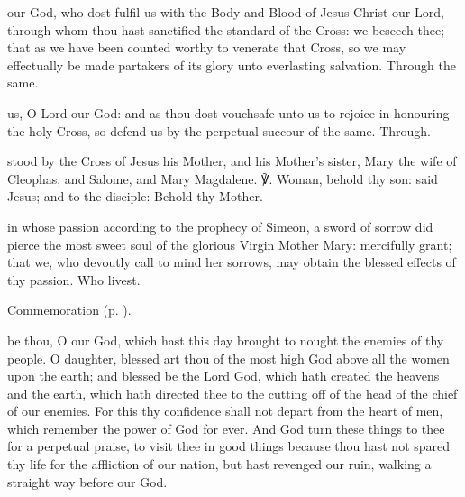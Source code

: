 
\secret
{} our God, who dost fulfil us with the Body and Blood of Jesus Christ our Lord, through whom thou hast sanctified the standard of the Cross: we beseech thee; that as we have been counted worthy to venerate that Cross, so we may effectually be made partakers of its glory unto everlasting salvation. Through the same.


\postcommunion
{} us, O Lord our God: and as thou dost vouchsafe unto us to rejoice in honouring the holy Cross, so defend us by the perpetual succour of the same. Through.


\clearpage
{}

\introit
{} stood by the Cross of Jesus his Mother, and his Mother's sister, Mary the wife of Cleophas, and Salome, and Mary Magdalene. ℣. Woman, behold thy son: said Jesus; and to the disciple: Behold thy Mother.

\collect\label{SevenSorrowsCollect}
 in whose passion according to the prophecy of Simeon, a sword of sorrow did pierce the most sweet soul of the glorious Virgin Mother Mary: mercifully grant; that we, who devoutly call to mind her sorrows, may obtain the blessed effects of thy passion. Who livest.
\begin{rubric}
	 Commemoration  (p. \pageref{NicomedesCollect}).
\end{rubric}

 be thou, O our God, which hast this day brought to nought the enemies of thy people. O daughter, blessed art thou of the most high God above all the women upon the earth; and blessed be the Lord God, which hath created the heavens and the earth, which hath directed thee to the cutting off of the head of the chief of our enemies. For this thy confidence shall not depart from the heart of men, which remember the power of God for ever. And God turn these things to thee for a perpetual praise, to visit thee in good things because thou hast not spared thy life for the affliction of our nation, but hast revenged our ruin, walking a straight way before our God.

